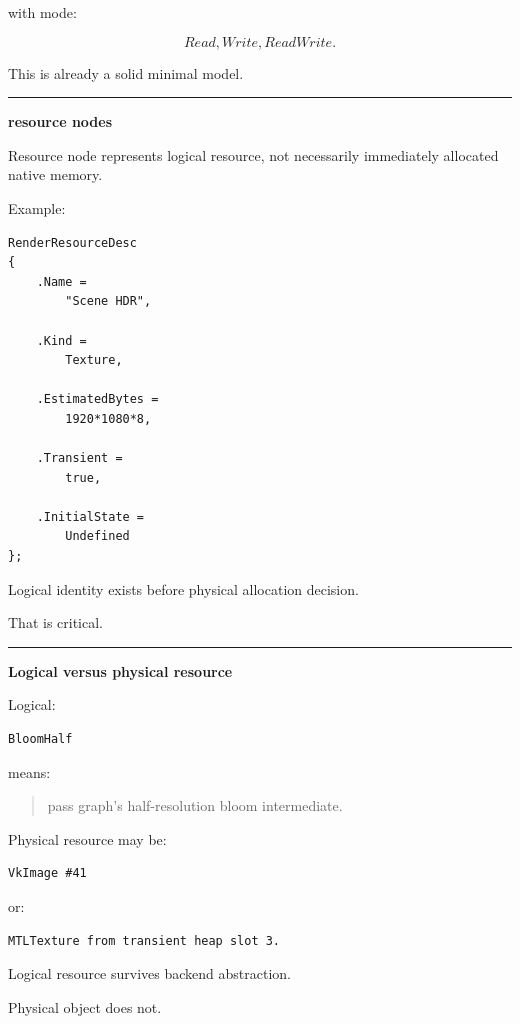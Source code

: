 with mode:

\[
Read,
Write,
ReadWrite.
\]

This is already a solid minimal model.

\begin{center}\rule{0.5\linewidth}{0.5pt}\end{center}

\textbf{resource nodes}

Resource node represents logical resource, not necessarily immediately allocated native memory.

Example:

\begin{verbatim}
RenderResourceDesc
{
    .Name =
        "Scene HDR",

    .Kind =
        Texture,

    .EstimatedBytes =
        1920*1080*8,

    .Transient =
        true,

    .InitialState =
        Undefined
};
\end{verbatim}

Logical identity exists before physical allocation decision.

That is critical.

\begin{center}\rule{0.5\linewidth}{0.5pt}\end{center}

\textbf{Logical versus physical resource}

Logical:

\begin{verbatim}
BloomHalf
\end{verbatim}

means:

\begin{quote}
pass graph's half-resolution bloom intermediate.
\end{quote}

Physical resource may be:

\begin{verbatim}
VkImage #41
\end{verbatim}

or:

\begin{verbatim}
MTLTexture from transient heap slot 3.
\end{verbatim}

Logical resource survives backend abstraction.

Physical object does not.

